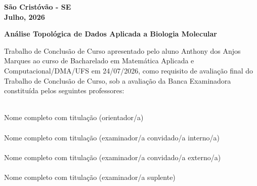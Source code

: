 \documentclass[12pt, a4paper]{article}
\theoremstyle{plain}
\theoremstyle{definition}
\theoremstyle{remark}
\begin{document}
\begin{titlepage}
    \vfill

    \begin{center}
        \fontsize{12pt}{14pt}\selectfont
        \textbf{São Cristóvão - SE} \\
        \vspace{0.2cm}
        \textbf{Julho, 2026}
    \end{center}
\end{titlepage}


\newpage
\thispagestyle{empty}

\vspace*{1cm}

\begin{center}
    \fontsize{14pt}{18pt}\selectfont
    \textbf{Análise Topológica de Dados Aplicada a Biologia Molecular}
\end{center}

\vspace{1.5cm}

\begin{flushleft}
    \fontsize{11pt}{14pt}\selectfont
    Trabalho de Conclusão de Curso apresentado pelo aluno Anthony dos Anjos Marques ao curso de Bacharelado em Matemática Aplicada e Computacional/DMA/UFS em 24/07/2026, como requisito de avaliação final do Trabalho de Conclusão de Curso, sob a avaliação da Banca Examinadora constituída pelos seguintes professores:
\end{flushleft}

\vspace{2cm}

\begin{center}
    \underline{\hspace{10cm}} \\
    \fontsize{10pt}{12pt}\selectfont Nome completo com titulação (orientador/a)\\
    \vspace{1.5cm}
    \underline{\hspace{10cm}} \\
    \fontsize{10pt}{12pt}\selectfont Nome completo com titulação (examinador/a convidado/a interno/a) \\
    \vspace{1.5cm}
    \underline{\hspace{10cm}} \\
    \fontsize{10pt}{12pt}\selectfont Nome completo com titulação (examinador/a convidado/a externo/a) \\
    \vspace{1.5cm}
    \underline{\hspace{10cm}} \\
    \fontsize{10pt}{12pt}\selectfont Nome completo com titulação (examinador/a suplente)
\end{center}
\end{document}
